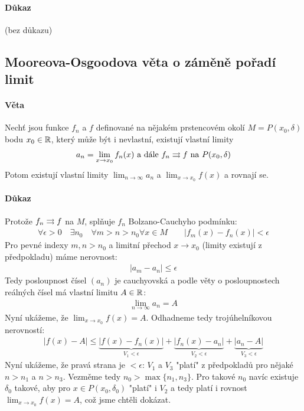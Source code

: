 \documentclass[a4paper,10pt]{article}
\begin{document}
\paragraph{Důkaz}
(bez důkazu)


\subsection{Mooreova-Osgoodova věta o záměně pořadí limit}
\setcounter{equation}{0}
\paragraph{Věta}
Nechť jsou funkce $f_n$ a $f$ definované na nějakém prstencovém okolí $M = P(x_0,
\delta)$ bodu $x_0 \in \mathbb{R}$, který může být i nevlastní, existují vlastní limity
\begin{align*}
	a_n = \lim_{x \to x_0} f_n(x) \text{ a dále } f_n \rightrightarrows f \text{ na } P(x_0,
	\delta)
\end{align*}
Potom existují vlastní limity $\lim_{n\to\infty} a_n$ a $\lim_{x\to x_0} f(x)$ a
rovnají se.
\paragraph{Důkaz}
Protože $f_n \rightrightarrows f$ na $M$, splňuje $f_n$ Bolzano-Cauchyho podmínku:
\begin{align}
	\forall \epsilon > 0 \quad \exists n_0 \quad \forall m > n > n_0 \forall x
	\in M \qquad |f_m(x) - f_n(x)| < \epsilon
\end{align}
Pro pevné indexy $m,n> n_0$ a limitní přechod $x\to x_0$ (limity existují z
předpokladu) máme nerovnost:
\begin{align}
	|a_m - a_n| \le \epsilon
\end{align}
Tedy posloupnost čísel $(a_n)$ je cauchyovská a podle věty o posloupnostech
reálných čísel má vlastní limitu $A \in \mathbb{R}$:
\begin{align}
	\lim_{n\to\infty} a_n = A
\end{align}
Nyní ukážeme, že $\lim_{x\to x_0} f(x) = A$. Odhadneme tedy trojúhelníkovou
nerovností:
\begin{align}
	| f(x) - A | \le \underbrace{|f(x) - f_n(x)|}_{V_1 < \epsilon} + \underbrace{|f_n(x) -
	a_n |}_{V_2 < \epsilon} + \underbrace{|a_n - A|}_{V_3 < \epsilon}
\end{align}
Nyní ukážeme, že pravá strana je $< \epsilon$: $V_1$ a $V_3$ "platí" z předpokladů
pro nějaké $n > n_1$ a $ n > n_3$. Vezměme tedy $n_0 > \max \{ n_1, n_3 \}$. Pro
takové $n_0$ navíc existuje $\delta_0$ takové, aby pro $x \in P(x_0, \delta_0)$
"platí" i $V_2$ a tedy platí i rovnost $\lim_{x\to x_0} f(x) = A$, což jsme
chtěli dokázat.
\end{document}
